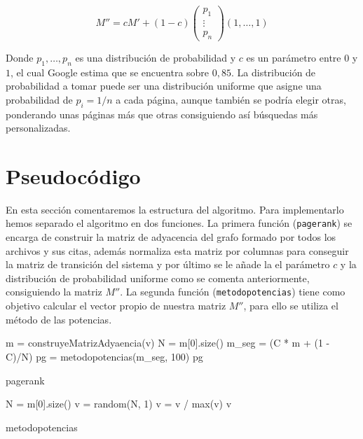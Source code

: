 \documentclass[size=a4, parskip=half, titlepage=false, toc=flat, toc=bib, 12pt]{scrartcl}
\theoremstyle{theorem-style}
\theoremstyle{definition-style}
\theoremstyle{remark-style}
\theoremstyle{example-style}
\theoremstyle{definition-style}
\theoremstyle{remark-style}
\begin{document}
$$M'' = cM' + (1-c)\begin{pmatrix}
p_1 \\
\vdots \\
p_n \end{pmatrix} (1, \dots, 1)$$

Donde $p_1, \dots , p_n$ es una distribución de probabilidad y $c$ es un parámetro entre $0$ y $1$, el cual Google estima que se encuentra sobre $0,85$. La distribución de probabilidad a tomar puede ser una distribución uniforme que asigne una probabilidad de $p_i = 1/n$ a cada página, aunque también se podría elegir otras, ponderando unas páginas más que otras consiguiendo así búsquedas más personalizadas.

\newpage

\section{Pseudocódigo}
En esta sección comentaremos la estructura del algoritmo. Para implementarlo hemos separado el algoritmo en dos funciones. La primera función (\verb|pagerank|) se encarga de construir la matriz de adyacencia del grafo formado por todos los archivos y sus citas, además normaliza esta matriz por columnas para conseguir la matriz de transición del sistema y por último se le añade la el parámetro $c$ y la distribución de probabilidad uniforme como se comenta anteriormente, consiguiendo la matriz $M''$. La segunda función (\verb|metodopotencias|) tiene como objetivo calcular el vector propio de nuestra matriz $M''$, para ello se utiliza el método de las potencias.

\begin{algorithm}[H]
  m = construyeMatrizAdyaencia(v)\;
  N = m[0].size()\;
  m\_seg = (C * m + (1 - C)/N)\;
  pg = metodopotencias(m\_seg, 100)\;
  \Return pg
\caption{pagerank}
\end{algorithm}

\begin{algorithm}[H]

  N = m[0].size()\;
  v = random(N, 1)\;
  v = v / max(v)\;
  \Return v

\caption{metodopotencias}
\end{algorithm}
\end{document}
